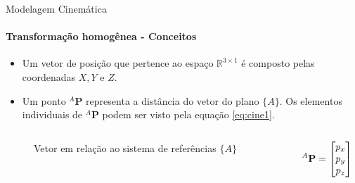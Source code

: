 \documentclass[aspectratio=169]{beamer}
\begin{document}
\begin{frame}{Modelagem Cinemática}
    \framesubtitle{Transformação homogênea - Conceitos}
    \begin{itemize}
        \item Um vetor de posição que pertence ao espaço $\mathbb{R}^{3 \times 1}$ é composto pelas coordenadas $X,Y$ e $Z$.
        \item Um ponto ${}^A\mathbf{P}$ representa a distância do vetor do plano $\{A\}$. Os elementos individuais de ${}^A\mathbf{P}$ podem ser visto pela equação \eqref{eq:cine1}.
    \end{itemize}
    \begin{columns}[c]
        \begin{column}{0.6\textwidth}
            \begin{figure}
                \centering
                \caption{Vetor em relação ao sistema de referências $\{A\}$}
                \label{fig:cine1f}
            \end{figure}
        \end{column}
        \begin{column}{0.3\textwidth}
            \begin{equation}\label{eq:cine1}
                \color{black}{{}^A\mathbf{P} = \begin{bmatrix}
                    p_x \\ p_y \\ p_z
                \end{bmatrix}}
                \color{gray}{}
            \end{equation}
        \end{column}
    \end{columns}
\end{frame}
\end{document}
